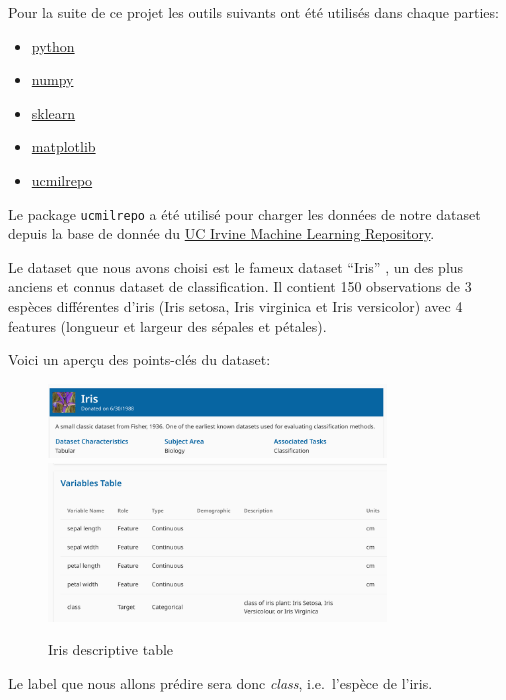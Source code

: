 \documentclass[
]{article}
\providecommand{\tightlist}{%
  \setlength{\itemsep}{0pt}\setlength{\parskip}{0pt}}
\begin{document}
Pour la suite de ce projet les outils suivants ont été utilisés dans
chaque parties:

\begin{itemize}
\tightlist
\item
  \href{https://www.python.org/}{python}
\item
  \href{https://numpy.org/}{numpy}
\item
  \href{https://scikit-learn.org/stable/}{sklearn}
\item
  \href{https://matplotlib.org/}{matplotlib}
\item
  \href{https://github.com/uci-ml-repo/ucimlrepo}{ucmilrepo}
\end{itemize}

Le package \texttt{ucmilrepo} a été utilisé pour charger les données de
notre dataset depuis la base de donnée du
\href{https://archive.ics.uci.edu/ml/index}{UC Irvine Machine Learning
Repository}.

Le dataset que nous avons choisi est le fameux dataset ``Iris''
\cite{r.a.fisherIris1936}, un des plus anciens et connus dataset de
classification. Il contient 150 observations de 3 espèces différentes
d'iris (Iris setosa, Iris virginica et Iris versicolor) avec 4 features
(longueur et largeur des sépales et pétales).

Voici un aperçu des points-clés du dataset:

\begin{figure}
\centering
\includegraphics[width=0.8\textwidth,height=\textheight]{../res/iris_img.png}
\includegraphics[width=0.8\textwidth,height=\textheight]{../res/iris_table.png}
\caption{Iris descriptive table}
\end{figure}

Le label que nous allons prédire sera donc \emph{class}, i.e.~l'espèce
de l'iris.
\end{document}
